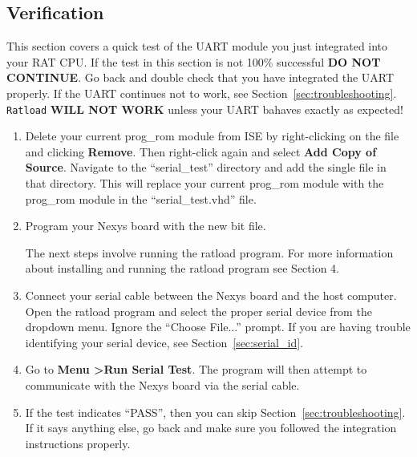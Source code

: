 \documentclass[notitlepage]{article}
\newcommand{\infosign}{\fontencoding{U}\fontfamily{futs}\huge\selectfont\char 116\relax}
\begin{document}
\subsection{Verification}
This section covers a quick test of the UART module you just integrated into your RAT CPU. If the test in this section is not 100\% successful \textbf{DO NOT CONTINUE}. Go back and double check that you have integrated the UART properly. If the UART continues not to work, see Section~\ref{sec:troubleshooting}. \texttt{Ratload} \textbf{WILL NOT WORK} unless your UART bahaves exactly as expected!

\begin{enumerate}
\item Delete your current prog\_rom module from ISE by right-clicking on the file and clicking \textbf{Remove}. Then right-click again and select \textbf{Add Copy of Source}. Navigate to the ``serial\_test'' directory and add the single file in that directory. This will replace your current prog\_rom module with the prog\_rom module in the ``serial\_test.vhd'' file. 

\item Program your Nexys board with the new bit file.

\begin{infobox}
  {\infosign} The next steps involve running the ratload program. For more information about installing and running the ratload program see Section 4. %
\end{infobox}

\item Connect your serial cable between the Nexys board and the host computer. Open the ratload program and select the proper serial device from the dropdown menu. Ignore the ``Choose File...'' prompt. If you are having trouble identifying your serial device, see Section~\ref{sec:serial_id}.

\item Go to \textbf{Menu \textgreater Run Serial Test}. The program will then attempt to communicate with the Nexys board via the serial cable.

\item If the test indicates ``PASS'', then you can skip Section~\ref{sec:troubleshooting}. If it says anything else, go back and make sure you followed the integration instructions properly.
\end{enumerate}
\end{document}
